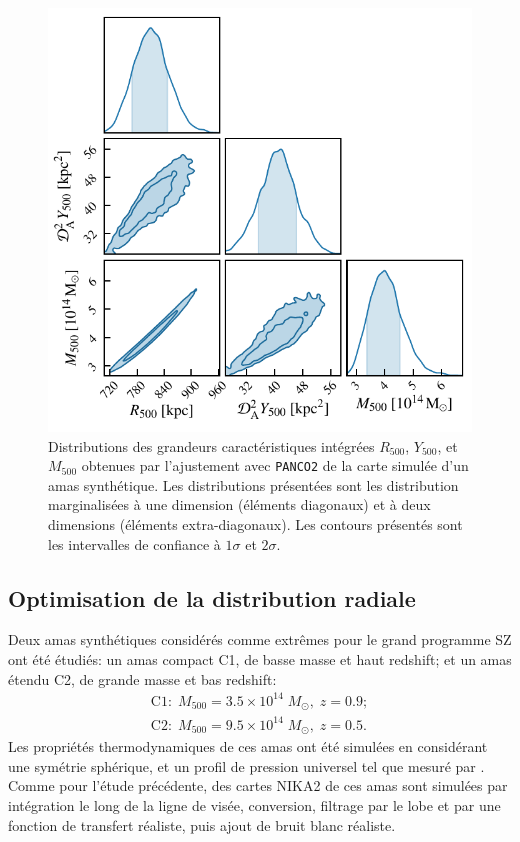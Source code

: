 \begin{figure}[t]
    \centering
    \includegraphics[width=.6\linewidth]{Figures/Chap_panco/demo_plots/integrated_values.pdf}
    \caption{
        Distributions des grandeurs caractéristiques intégrées $R_{500}$, $Y_{500}$, et $M_{500}$ obtenues par l'ajustement avec \texttt{PANCO2} de la carte simulée d'un amas synthétique.
        Les distributions présentées sont les distribution marginalisées à une dimension (éléments diagonaux) et à deux dimensions (éléments extra-diagonaux).
        Les contours présentés sont les intervalles de confiance à $1\sigma$ et $2\sigma$.
    }
    \label{fig:panco2:actlike_integ}
\end{figure}

\subsection{Optimisation de la distribution radiale} \label{sec:panco:binning}

Deux amas synthétiques considérés comme extrêmes pour le grand programme SZ ont été étudiés: un amas compact C1, de basse masse et haut redshift; et un amas étendu C2, de grande masse et bas redshift:
\begin{align}
    \label{eq:panco:synth_clusters}
    \nonumber \text{C1}: \; M_{500} = 3.5 \times 10^{14} \; M_\odot, \; z=0.9 ; \\
              \text{C2}: \; M_{500} = 9.5 \times 10^{14} \; M_\odot, \; z=0.5 .
\end{align}
Les propriétés thermodynamiques de ces amas ont été simulées en considérant une symétrie sphérique, et un profil de pression universel tel que mesuré par .
Comme pour l'étude précédente, des cartes NIKA2 de ces amas sont simulées par intégration le long de la ligne de visée, conversion, filtrage par le lobe et par une fonction de transfert réaliste, puis ajout de bruit blanc réaliste.

